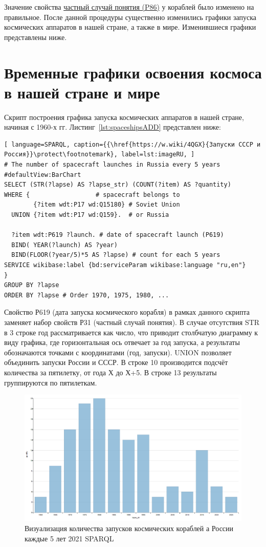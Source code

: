 Значение свойства \href{https://www.wikidata.org/wiki/Property:P86}{частный случай понятия (P86)} у кораблей было изменено на правильное. После данной процедуры существенно изменились графики запуска космических аппаратов в нашей стране, а также в мире. Изменившиеся графики представлены ниже.

\section{Временные графики освоения космоса в нашей стране и мире}
Скрипт построения графика запуска космических аппаратов в нашей стране, начиная с 1960-х гг. Листинг~\ref{lst:spaceshipsADD} представлен ниже:
\begin{lstlisting}[ language=SPARQL, caption={{\href{https://w.wiki/4QGX}{Запуски СССР и Россия}}\protect\footnotemark}, label=lst:imageRU, ]
# The number of spacecraft launches in Russia every 5 years
#defaultView:BarChart
SELECT (STR(?lapse) AS ?lapse_str) (COUNT(?item) AS ?quantity)
WHERE {                  # spacecraft belongs to
        {?item wdt:P17 wd:Q15180} # Soviet Union
  UNION {?item wdt:P17 wd:Q159}.  # or Russia
  
  ?item wdt:P619 ?launch. # date of spacecraft launch (P619)
  BIND( YEAR(?launch) AS ?year) 
  BIND(FLOOR(?year/5)*5 AS ?lapse) # count for each 5 years
SERVICE wikibase:label {bd:serviceParam wikibase:language "ru,en"}
} 
GROUP BY ?lapse
ORDER BY ?lapse # Order 1970, 1975, 1980, ...
\end{lstlisting}
Свойство Р619 (дата запуска космического корабля) в рамках данного скрипта заменяет набор свойств Р31 (частный случай понятия). В случае отсутствия STR в 3 строке год рассматривается как число, что приводит столбчатую диаграмму к виду графика, где горизонтальная ось отвечает за год запуска, а результаты обозначаются точками с координатами (год, запуски). UNION позволяет объединить запуски России и СССР. В строке 10 производится подсчёт количества за пятилетку, от года Х до Х+5. В строке 13 результаты группируются по пятилеткам.

\begin{figure}[h!]
  \includegraphics[width=\linewidth]{graphics/chapter/spacecraft_space_station/ImgRU.png}
  \caption[График Россия]{Визуализация количества запусков космических кораблей а России каждые 5 лет 2021 SPARQL}%
  \label{fig:ImageRU5}%
\end{figure}

